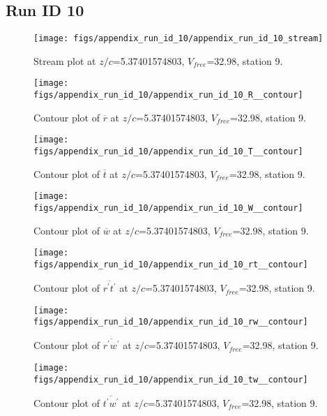 \subsection{Run ID 10}
\begin{figure}[H]
\centering
\texttt{[image: figs/appendix\_run\_id\_10/appendix\_run\_id\_10\_stream]}
\caption{Stream plot at $z/c$=5.37401574803, $V_{free}$=32.98, station 9.}
\label{fig:appendix_run_id_10_stream}
\end{figure}


\begin{figure}[H]
\centering
\texttt{[image: figs/appendix\_run\_id\_10/appendix\_run\_id\_10\_R\_\_contour]}
\caption{Contour plot of $\overline{r}$ at $z/c$=5.37401574803, $V_{free}$=32.98, station 9.}
\label{fig:appendix_run_id_10_R__contour}
\end{figure}


\begin{figure}[H]
\centering
\texttt{[image: figs/appendix\_run\_id\_10/appendix\_run\_id\_10\_T\_\_contour]}
\caption{Contour plot of $\overline{t}$ at $z/c$=5.37401574803, $V_{free}$=32.98, station 9.}
\label{fig:appendix_run_id_10_T__contour}
\end{figure}


\begin{figure}[H]
\centering
\texttt{[image: figs/appendix\_run\_id\_10/appendix\_run\_id\_10\_W\_\_contour]}
\caption{Contour plot of $\overline{w}$ at $z/c$=5.37401574803, $V_{free}$=32.98, station 9.}
\label{fig:appendix_run_id_10_W__contour}
\end{figure}


\begin{figure}[H]
\centering
\texttt{[image: figs/appendix\_run\_id\_10/appendix\_run\_id\_10\_rt\_\_contour]}
\caption{Contour plot of $\overline{r^\prime t^\prime}$ at $z/c$=5.37401574803, $V_{free}$=32.98, station 9.}
\label{fig:appendix_run_id_10_rt__contour}
\end{figure}


\begin{figure}[H]
\centering
\texttt{[image: figs/appendix\_run\_id\_10/appendix\_run\_id\_10\_rw\_\_contour]}
\caption{Contour plot of $\overline{r^\prime w^\prime}$ at $z/c$=5.37401574803, $V_{free}$=32.98, station 9.}
\label{fig:appendix_run_id_10_rw__contour}
\end{figure}


\begin{figure}[H]
\centering
\texttt{[image: figs/appendix\_run\_id\_10/appendix\_run\_id\_10\_tw\_\_contour]}
\caption{Contour plot of $\overline{t^\prime w^\prime}$ at $z/c$=5.37401574803, $V_{free}$=32.98, station 9.}
\label{fig:appendix_run_id_10_tw__contour}
\end{figure}


